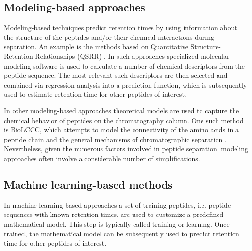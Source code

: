 \documentclass[a4paper]{article}
\begin{document}


\subsection{Modeling-based approaches}

Modeling-based techniques predict retention times by using information
about the structure of the peptides and/or their chemical interactions
during separation. An example is the methods based on Quantitative
Structure-Retention Relationships (QSRR) \cite{Kaliszan2005,
Baczek2005}. In such approaches specialized molecular modeling
software is used to calculate a number of chemical descriptors from
the peptide sequence. The most relevant such descriptors are then
selected and combined via regression analysis into a prediction
function, which is subsequently used to estimate retention time for
other peptides of interest.

\vspace{0.15cm}

In other modeling-based approaches theoretical models are used to
capture the chemical behavior of peptides on the chromatography
column. One such method is BioLCCC, which attempts to model the
connectivity of the amino acids in a peptide chain and the general
mechanisms of chromatographic
separation \cite{gorshkov2006}. Nevertheless, given the numerous
factors involved in peptide separation, modeling approaches often
involve a considerable number of simplifications.

 
\subsection{Machine learning-based methods}

In machine learning-based approaches a set of training peptides,
i.e. peptide sequences with known retention times, are used to
customize a predefined mathematical model. This step is typically
called training or learning. Once trained, the mathematical model can
be subsequently used to predict retention time for other peptides of
interest.
\end{document}
